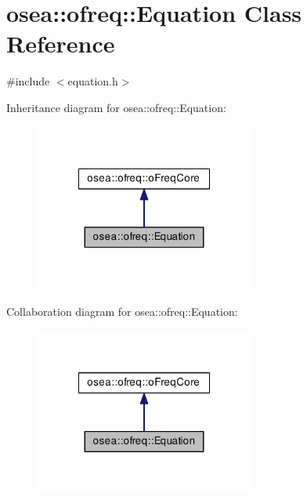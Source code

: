 \hypertarget{classosea_1_1ofreq_1_1_equation}{\section{osea\-:\-:ofreq\-:\-:Equation Class Reference}
\label{classosea_1_1ofreq_1_1_equation}
}


{\ttfamily \#include $<$equation.\-h$>$}



Inheritance diagram for osea\-:\-:ofreq\-:\-:Equation\-:\nopagebreak
\begin{figure}[H]
\begin{center}
\leavevmode
\includegraphics[width=204pt]{classosea_1_1ofreq_1_1_equation__inherit__graph}
\end{center}
\end{figure}


Collaboration diagram for osea\-:\-:ofreq\-:\-:Equation\-:\nopagebreak
\begin{figure}[H]
\begin{center}
\leavevmode
\includegraphics[width=204pt]{classosea_1_1ofreq_1_1_equation__coll__graph}
\end{center}
\end{figure}
